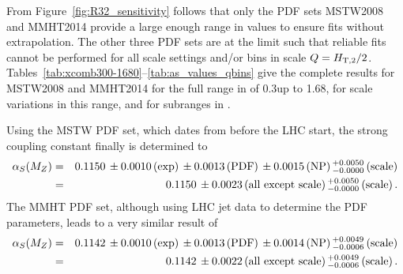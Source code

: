 From Figure~\ref{fig:R32_sensitivity} follows that only the PDF sets
MSTW2008 and MMHT2014 provide a large enough range in \alpsmz values
to ensure fits without extrapolation. The other three PDF sets are at
the limit such that reliable fits cannot be performed for all scale
settings and/or bins in scale
$Q=H_{\mathrm{T,2}}/2$. Tables~\ref{tab:xcomb300-1680}--\ref{tab:as_values_qbins}
give the complete results for MSTW2008 and MMHT2014 for the full range
in \httwo of 0.3\TeV up to 1.68\TeV, for scale variations in this
range, and for subranges in \httwo.

Using the MSTW PDF set, which dates from before the LHC start, the
strong coupling constant finally is determined to
%
\begin{eqnarray*}
  \alpha_S(M_Z) &=& 0.1150\,\pm0.0010\,\textrm{(exp)}\,\pm0.0013\,\textrm{(PDF)}\,\pm0.0015\,\textrm{(NP)}\,^{+0.0050}_{-0.0000}\,\textrm{(scale)}\\
  &=& 0.1150\,\pm0.0023\,\textrm{(all except scale)}\,^{+0.0050}_{-0.0000}\,\textrm{(scale)}\,.
\end{eqnarray*}
%
The MMHT PDF set, although using LHC jet data to determine the PDF
parameters, leads to a very similar result of
\begin{eqnarray*}
  \alpha_S(M_Z) &=& 0.1142\,\pm0.0010\,\textrm{(exp)}\,\pm0.0013\,\textrm{(PDF)}\,\pm0.0014\,\textrm{(NP)}\,^{+0.0049}_{-0.0006}\,\textrm{(scale)}\\
  &=& 0.1142\,\pm0.0022\,\textrm{(all except scale)}\,^{+0.0049}_{-0.0006}\,\textrm{(scale)}\,.
\end{eqnarray*}

